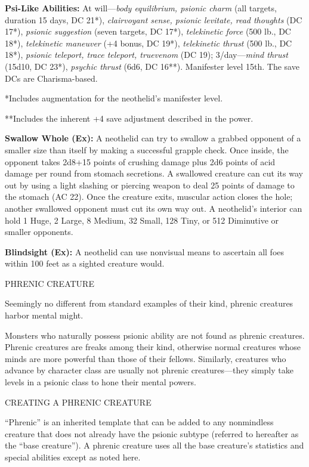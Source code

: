 \documentclass{article}
\begin{document}
\textbf{Psi-Like Abilities: }At will---\textit{body equilibrium, psionic charm 
}(all targets, duration 15 days, DC 21*), \textit{clairvoyant sense, psionic levitate, 
read thoughts }(DC 17*), \textit{psionic suggestion }(seven targets, DC 17*), \textit{telekinetic 
force }(500 lb., DC 18*), \textit{telekinetic maneuver }(+4 bonus, DC 19*), \textit{telekinetic 
thrust }(500 lb., DC 18*), \textit{psionic teleport, trace teleport, truevenom 
}(DC 19); 3/day---\textit{mind thrust }(15d10, DC 23*), \textit{psychic thrust 
}(6d6, DC 16**). Manifester level 15th. The save DCs are Charisma-based.

*Includes augmentation for the neothelid's manifester level. 

**Includes the inherent +4 save adjustment described in the power.

\textbf{Swallow Whole (Ex):} A neothelid can try to swallow a grabbed opponent 
of a smaller size than itself by making a successful grapple check. Once inside, 
the opponent takes 2d8+15 points of crushing damage plus 2d6 points of acid damage 
per round from stomach secretions. A swallowed creature can cut its way out by 
using a light slashing or piercing weapon to deal 25 points of damage to the stomach 
(AC 22). Once the creature exits, muscular action closes the hole; another swallowed 
opponent must cut its own way out. A neothelid's interior can hold 1 Huge, 2 Large, 
8 Medium, 32 Small, 128 Tiny, or 512 Diminutive or smaller opponents.

\textbf{Blindsight (Ex):} A neothelid can use nonvisual means to ascertain all 
foes within 100 feet as a sighted creature would.

\vspace{12pt}
{\LARGE{}PHRENIC CREATURE}

Seemingly no different from standard examples of their kind, phrenic creatures 
harbor mental might.

Monsters who naturally possess psionic ability are not found as phrenic creatures. 
Phrenic creatures are freaks among their kind, otherwise normal creatures whose 
minds are more powerful than those of their fellows. Similarly, creatures who advance 
by character class are usually not phrenic creatures---they simply take levels 
in a psionic class to hone their mental powers.

{\large{}CREATING A PHRENIC CREATURE}

``Phrenic'' is an inherited template that can be added to any nonmindless creature 
that does not already have the psionic subtype (referred to hereafter as the ``base 
creature''). A phrenic creature uses all the base creature's statistics and special 
abilities except as noted here.
\end{document}
